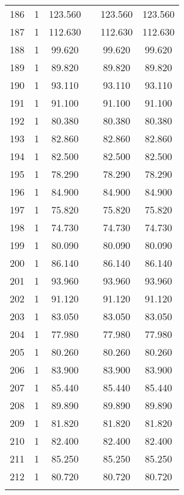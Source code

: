 \begin{table}[!htbp]
\begin{tabular}{@{\extracolsep{5pt}}lccccc}
186 & 1 & 123.560 &  & 123.560 & 123.560 \\ 
187 & 1 & 112.630 &  & 112.630 & 112.630 \\ 
188 & 1 & 99.620 &  & 99.620 & 99.620 \\ 
189 & 1 & 89.820 &  & 89.820 & 89.820 \\ 
190 & 1 & 93.110 &  & 93.110 & 93.110 \\ 
191 & 1 & 91.100 &  & 91.100 & 91.100 \\ 
192 & 1 & 80.380 &  & 80.380 & 80.380 \\ 
193 & 1 & 82.860 &  & 82.860 & 82.860 \\ 
194 & 1 & 82.500 &  & 82.500 & 82.500 \\ 
195 & 1 & 78.290 &  & 78.290 & 78.290 \\ 
196 & 1 & 84.900 &  & 84.900 & 84.900 \\ 
197 & 1 & 75.820 &  & 75.820 & 75.820 \\ 
198 & 1 & 74.730 &  & 74.730 & 74.730 \\ 
199 & 1 & 80.090 &  & 80.090 & 80.090 \\ 
200 & 1 & 86.140 &  & 86.140 & 86.140 \\ 
201 & 1 & 93.960 &  & 93.960 & 93.960 \\ 
202 & 1 & 91.120 &  & 91.120 & 91.120 \\ 
203 & 1 & 83.050 &  & 83.050 & 83.050 \\ 
204 & 1 & 77.980 &  & 77.980 & 77.980 \\ 
205 & 1 & 80.260 &  & 80.260 & 80.260 \\ 
206 & 1 & 83.900 &  & 83.900 & 83.900 \\ 
207 & 1 & 85.440 &  & 85.440 & 85.440 \\ 
208 & 1 & 89.890 &  & 89.890 & 89.890 \\ 
209 & 1 & 81.820 &  & 81.820 & 81.820 \\ 
210 & 1 & 82.400 &  & 82.400 & 82.400 \\ 
211 & 1 & 85.250 &  & 85.250 & 85.250 \\ 
212 & 1 & 80.720 &  & 80.720 & 80.720 \\ 
\hline \\[-1.8ex] 
\end{tabular} 
\end{table} 
